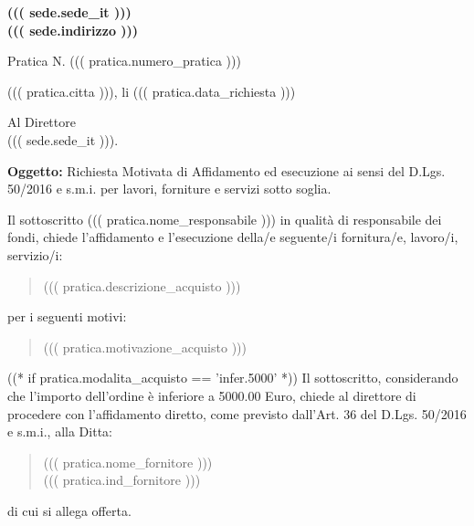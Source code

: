 \documentclass[a4paper,12pt]{letter}
\begin{document}
\vspace{-2.5cm}
\begin{center}
\small \bf
((( sede.sede_it ))) \\
((( sede.indirizzo )))
\end{center}
\thispagestyle{empty}
\vspace{1cm}

{\small Pratica N. ((( pratica.numero_pratica ))) }
\vspace{1cm}

\begin{flushright}
((( pratica.citta ))), li ((( pratica.data_richiesta ))) 
\end{flushright}
\vspace{1cm}

Al Direttore \\
((( sede.sede_it ))).
\vspace{0.5cm}
	 
{\bf Oggetto:} Richiesta Motivata di Affidamento ed esecuzione ai sensi del D.Lgs. 50/2016 e s.m.i.
per lavori, forniture e servizi sotto soglia.

\vspace{0.5cm}

Il sottoscritto ((( pratica.nome_responsabile ))) in qualit\`a di 
responsabile dei fondi, chiede l'affidamento e l'esecuzione della/e
seguente/i fornitura/e, lavoro/i, servizio/i:

\begin{quote}

((( pratica.descrizione_acquisto )))
\end{quote}

per i seguenti motivi:

\begin{quote}
((( pratica.motivazione_acquisto )))
\end{quote}

((* if pratica.modalita_acquisto == 'infer.5000' *))
Il sottoscritto, considerando che l'importo dell'ordine
\`e inferiore a 5000.00 Euro,
chiede al direttore di procedere con l'affidamento diretto,
come previsto dall'Art. 36 del D.Lgs. 50/2016 e s.m.i., alla Ditta: 
\begin{quote}
((( pratica.nome_fornitore )))\\
((( pratica.ind_fornitore )))
\end{quote}

di cui si allega offerta.
\end{document}
